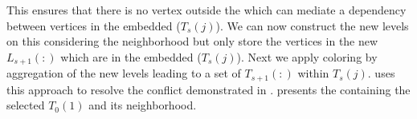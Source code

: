 This ensures that there is no vertex outside the \subgraph which can mediate a \DK dependency between vertices in the embedded \levelGroup ($T_s(j)$). We can now construct the new levels on this \subgraph considering the neighborhood but only store the vertices in the new \levels $L_{s+1}(:)$ which are in the embedded \levelGroup ($T_s(j)$). Next we apply \DK coloring by aggregation of the new levels leading to a set of \levelGroups $T_{s+1}(:)$ within $T_s(j)$.  uses this approach to resolve the conflict demonstrated in .  presents the \subgraph containing the selected \levelGroup $T_0(1)$ and its \DONE neighborhood. %
